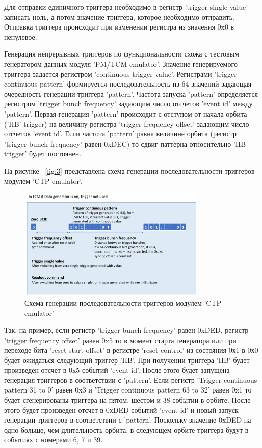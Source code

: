 \documentclass{article}
\begin{document}
Для отправки единичного триггера необходимо в регистр 'trigger single value' записать ноль, а потом значение триггера, которое необходимо отправить. Отправка триггера происходит при изменении регистра из значения 0x0 в ненулевое.



Генерация непрерывных триггеров по функциональности схожа с тестовым генератором данных модуля 'PM/TCM emulator'. Значение генерируемого триггера задается регистром 'continuous trigger value'. Регистрами 'trigger continuous pattern' формируется последовательность из 64 значений задающая очередность генерации триггера 'pattern'. Частота запуска 'pattern' определяется регистром 'trigger bunch frequency' задающим число отсчетов 'event id' между 'pattern'. Первая генерация 'pattern' происходит с отступом от начала орбита ('HB' trigger) на величину регистра 'trigger frequency offset' задающим число отсчетов 'event id'. Если частота 'pattern' равна величине орбита (регистр 'trigger bunch frequency' равен 0xDEC) то сдвиг паттерна относительно 'HB trigger' будет постоянен. 

На рисунке ~\ref{fig:3} представлена схема генерации последовательности триггеров модулем 'CTP emulator'.

\begin{figure}[H]
	\centering 
	\includegraphics[width=0.8\textwidth]{trigger generator.png}
	\caption{\label{fig:4} Схема генерации последовательности триггеров модулем 'CTP emulator'}
\end{figure}



Так, на пример, если регистр 'trigger bunch frequency' равен 0xDED, регистр 'trigger frequency offset' равен 0x5 то в момент старта генератора или при переходе бита 'reset start offset' в регистре 'reset control' из состояния 0х1 в 0х0 будет ожидаться следующий триггер 'HB'. При получении триггера 'HB' будет произведен отсчет в 0x5 событий 'event id'. После этого будет запущена генерация триггеров в соответствии с 'pattern'. Если регистр 'Trigger continuous pattern 31 to 0' равен 0x3 и 'Trigger continuous pattern 63 to 32' равен 0x1 то будет сгенерированы триггера на пятом, шестом и 38 событии в орбите. После этого будет произведен отсчет в 0хDED событий 'event id' и новый запуск генерации триггеров в соответствии с 'pattern'. Поскольку значение 0xDED на одно больше, чем длительность орбита, в следующем орбите триггера будут в событиях с номерами 6, 7 и 39.
\end{document}
